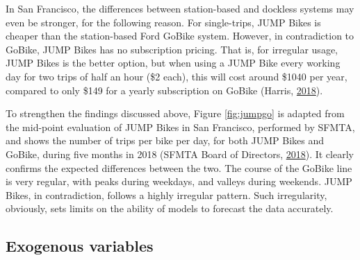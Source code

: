 \documentclass[12pt,oneside]{reedthesis}
\begin{document}
In San Francisco, the differences between station-based and dockless
systems may even be stronger, for the following reason. For
single-trips, JUMP Bikes is cheaper than the station-based Ford GoBike
system. However, in contradiction to GoBike, JUMP Bikes has no
subscription pricing. That is, for irregular usage, JUMP Bikes is the
better option, but when using a JUMP Bike every working day for two
trips of half an hour (\$2 each), this will cost around \$1040 per year,
compared to only \$149 for a yearly subscription on GoBike (Harris,
\protect\hyperlink{ref-harris2018}{2018}).

To strengthen the findings discussed above, Figure \ref{fig:jumpgo} is
adapted from the mid-point evaluation of JUMP Bikes in San Francisco,
performed by SFMTA, and shows the number of trips per bike per day, for
both JUMP Bikes and GoBike, during five months in 2018 (SFMTA Board of
Directors, \protect\hyperlink{ref-sfmta2018three}{2018}). It clearly
confirms the expected differences between the two. The course of the
GoBike line is very regular, with peaks during weekdays, and valleys
during weekends. JUMP Bikes, in contradiction, follows a highly
irregular pattern. Such irregularity, obviously, sets limits on the
ability of models to forecast the data accurately.

\subsection{Exogenous variables}\label{exogenous-variables}
\end{document}
